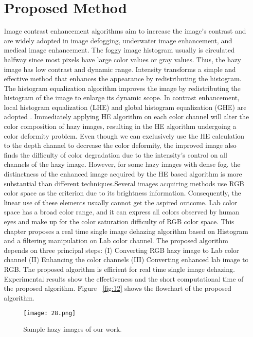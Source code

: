 \documentclass[doctor,english,listoffigures,listoftables]{thesis-uestc}
\begin{document}
\section{Proposed Method}
Image contrast enhancement algorithms aim to increase the image's contrast and are widely adopted in image defogging, underwater image enhancement, and medical image enhancement. The foggy image histogram usually is circulated halfway since most pixels have large color values or gray values. Thus, the hazy image has low contrast and dynamic range. Intensity transforms a simple and effective method that enhances the appearance by redistributing the histogram. The histogram equalization algorithm improves the image by redistributing the histogram of the image to enlarge its dynamic scope. In contrast enhancement, local histogram equalization (LHE) and global histogram equalization (GHE) are adopted . Immediately applying HE algorithm on each color channel will alter the color composition of hazy images, resulting in the HE algorithm undergoing a color deformity problem.
Even though we can exclusively use the HE calculation to the depth channel to decrease the color deformity, the improved image also finds the difficulty of color degradation due to the intensity's control on all channels of the hazy image. However, for some hazy images with dense fog, the distinctness of the enhanced image acquired by the HE based algorithm is more substantial than different techniques.Several images acquiring methods use RGB color space as the criterion due to its brightness information. Consequently, the linear use of these elements usually cannot get the aspired outcome. Lab color space has a broad color range, and it can express all colors observed by human eyes and make up for the color saturation difficulty of RGB color space. 
This chapter proposes a real time single image dehazing algorithm based on Histogram and a filtering manipulation on Lab color channel. The proposed algorithm depends on three principal steps: (I) Converting RGB hazy image to Lab color channel (II) Enhancing the color channels (III) Converting enhanced lab image to RGB.  The proposed algorithm is efficient for real time single image dehazing. Experimental results show the effectiveness and the short computational time of the proposed algorithm. Figure ~\ref{fig:12} shows the flowchart of the proposed algorithm. 
\begin{figure*}
	\centering
	\texttt{[image: 28.png]}
	\caption{Sample hazy images of our work.}
	\label{fig:13}
\end{figure*}
\end{document}
